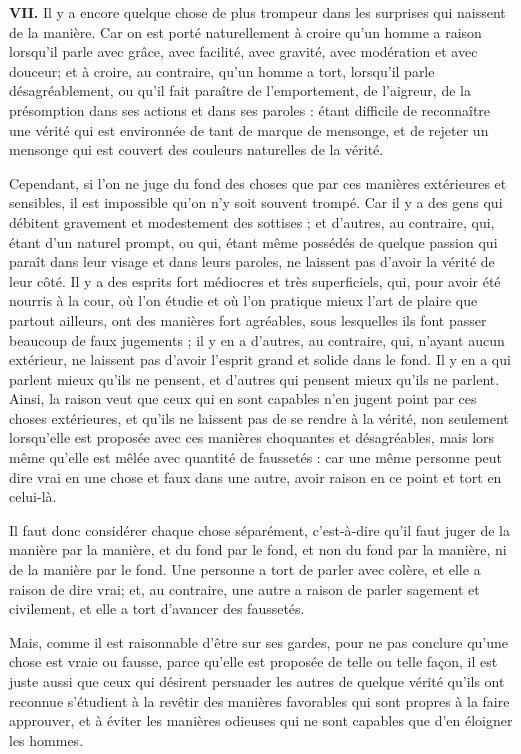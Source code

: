 \bigbreak
{\bfseries\scshape VII.} Il y a encore quelque chose de plus trompeur dans les surprises qui naissent de la manière. Car on est porté naturellement à croire qu'un homme a raison lorsqu'il parle avec grâce, avec facilité, avec gravité, avec modération et avec douceur; et à croire, au contraire, qu'un homme a tort, lorsqu'il parle désagréablement, ou qu'il fait paraître de l'emportement, de l'aigreur, de la présomption dans ses actions et dans ses paroles : étant difficile de reconnaître une vérité qui est environnée de tant de marque de mensonge, et de rejeter un mensonge qui est couvert des couleurs naturelles de la vérité.

Cependant, si l'on ne juge du fond des choses que par ces manières extérieures et sensibles, il est impossible qu'on n'y soit souvent trompé. Car il y a des gens qui débitent gravement et modestement des sottises ; et d'autres, au contraire, qui, étant d'un naturel prompt, ou qui, étant même possédés de quelque passion qui paraît dans leur visage et dans leurs paroles, ne laissent pas d'avoir la vérité de leur côté. Il y a des esprits fort médiocres et très superficiels, qui, pour avoir été nourris à la cour, où l'on étudie et où l'on pratique mieux l'art de plaire que partout ailleurs, ont des manières fort agréables, sous lesquelles ils font passer beaucoup de faux jugements ; il y en a d'autres, au contraire, qui, n'ayant aucun extérieur, ne laissent pas d'avoir l'esprit grand et solide dans le fond. Il y en a qui parlent mieux qu'ils ne pensent, et d'autres qui pensent mieux qu'ils ne parlent. Ainsi, la raison veut que ceux qui en sont capables n'en jugent point par ces choses extérieures, et qu'ils ne laissent pas de se rendre à la vérité, non seulement lorsqu'elle est proposée avec ces manières choquantes et désagréables, mais lors même qu'elle est mêlée avec quantité de faussetés : car une même personne peut dire vrai en une chose et faux dans une autre, avoir raison en ce point et tort en celui-là.

Il faut donc considérer chaque chose séparément, c'est-à-dire qu'il faut juger de la manière par la manière, et du fond par le fond, et non du fond par la manière, ni de la manière par le fond. Une personne a tort de parler avec colère, et elle a raison de dire vrai; et, au contraire, une autre a raison de parler sagement et civilement, et elle a tort d'avancer des faussetés.

Mais, comme il est raisonnable d'être sur ses gardes, pour ne pas conclure qu'une chose est vraie ou fausse, parce qu'elle est proposée de telle ou telle façon, il est juste aussi que ceux qui désirent persuader les autres de quelque vérité qu'ils ont reconnue s'étudient à la revêtir des manières favorables qui sont propres à la faire approuver, et à éviter les manières odieuses qui ne sont capables que d'en éloigner les hommes.

